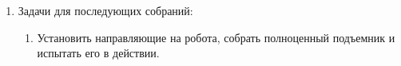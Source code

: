 \begin{enumerate}
\begin{enumerate}
    \end{enumerate}
    
	\item Задачи для последующих собраний:\newline
	\begin{enumerate}
	  \item Установить направляющие на робота, собрать полноценный подъемник и испытать его в действии.\newline
	  
    \end{enumerate}     
\end{enumerate}

\fillpage
